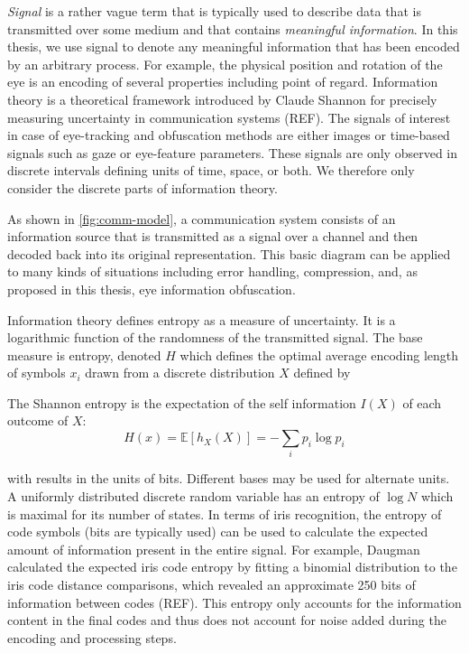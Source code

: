 \textit{Signal} is a rather vague term that is typically used to describe data that is transmitted over some medium and that contains \textit{meaningful information}. In this thesis, we use signal to denote any meaningful information that has been encoded by an arbitrary process. For example, the physical position and rotation of the eye is an encoding of several properties including point of regard. Information theory is a theoretical framework introduced by Claude Shannon for precisely measuring uncertainty in communication systems (REF). The signals of interest in case of eye-tracking and obfuscation methods are either images or time-based signals such as gaze or eye-feature parameters. These signals are only observed in discrete intervals defining units of time, space, or both. We therefore only consider the discrete parts of information theory. 

As shown in \cref{fig:comm-model}, a communication system consists of an information source that is transmitted as a signal over a channel and then decoded back into its original representation. This basic diagram can be applied to many kinds of situations including error handling, compression, and, as proposed in this thesis, eye information obfuscation.


Information theory defines entropy as a measure of uncertainty. It is a logarithmic function of the randomness of the transmitted signal. 
The base measure is entropy, denoted $H$ which defines the optimal average encoding length of symbols $x_i$ drawn from a discrete distribution $X$ defined by
\begin{definition}
The Shannon entropy is the expectation of the self information $I(X)$ of each outcome of $X$:
\begin{equation}
    H(x) = \mathbb{E}[h_X(X)] = - \sum_i p_i\log p_i
\end{equation}
\end{definition}

with results in the units of bits. Different bases may be used for alternate units. A uniformly distributed discrete random variable has an entropy of $\log{N}$ which is maximal for its number of states. In terms of iris recognition, the entropy of code symbols (bits are typically used) can be used to calculate the expected amount of information present in the entire signal. For example, Daugman calculated the expected iris code entropy by fitting a binomial distribution to the iris code distance comparisons, which revealed an approximate 250 bits of information between codes (REF). This entropy only accounts for the information content in the final codes and thus does not account for noise added during the encoding and processing steps. 

